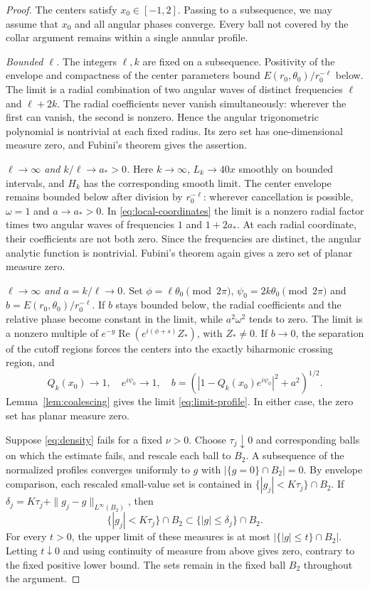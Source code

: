 \documentclass[11pt,twoside,leqno]{article}
\numberwithin{equation}{section}
\theoremstyle{definition}
\theoremstyle{remark}
\begin{document}
\begin{proof}
The centers satisfy $x_0\in[-1,2]$. Passing to a subsequence, we may
assume that $x_0$ and all angular phases converge. Every ball not
covered by the collar argument remains within a single annular profile.

\emph{Bounded $\ell$.}
The integers $\ell,k$ are fixed on a subsequence. Positivity of the
envelope and compactness of the center parameters bound
$E(r_0,\theta_0)/r_0^{-\ell}$ below. The limit is a radial combination
of two angular waves of distinct frequencies $\ell$ and $\ell+2k$.
The radial coefficients never vanish simultaneously: wherever the
first can vanish, the second is nonzero. Hence the angular
trigonometric polynomial is nontrivial at each fixed radius. Its
zero set has one-dimensional measure zero, and Fubini's theorem gives
the assertion.

\emph{$\ell\to\infty$ and $k/\ell\to a_*>0$.}
Here $k\to\infty$, $L_k\to40x$ smoothly on bounded intervals, and
$H_k$ has the corresponding smooth limit. The center envelope remains
bounded below after division by $r_0^{-\ell}$: wherever cancellation
is possible, $\omega=1$ and $a\to a_*>0$.
In \eqref{eq:local-coordinates} the limit is a nonzero radial factor
times two angular waves of frequencies $1$ and $1+2a_*$. At each radial coordinate, their coefficients are not both zero.
Since the frequencies are distinct, the angular analytic function is
nontrivial. Fubini's theorem again gives a zero set of planar measure
zero.

\emph{$\ell\to\infty$ and $a=k/\ell\to0$.}
Set $\phi=\ell\theta_0\pmod{2\pi}$,
$\psi_0=2k\theta_0\pmod{2\pi}$ and
$b=E(r_0,\theta_0)/r_0^{-\ell}$.
If $b$ stays bounded below, the radial coefficients and the relative
phase become constant in the limit, while $a^2\omega^2$ tends to
zero. The limit is a nonzero multiple of
$e^{-y}\operatorname{Re}(e^{i(\phi+s)}Z_*)$, with $Z_*\ne0$.
If $b\to0$, the separation of the cutoff regions forces the centers
into the exactly biharmonic crossing region, and
\[
 Q_k(x_0)\to1,\quad e^{i\psi_0}\to1,\quad
 b=(|1-Q_k(x_0)e^{i\psi_0}|^2+a^2)^{1/2}.
\]
Lemma~\ref{lem:coalescing} gives the limit \eqref{eq:limit-profile}.
In either case, the zero set has planar measure zero.

Suppose \eqref{eq:density} fails for a fixed $\nu>0$. Choose $\tau_j\downarrow0$ and corresponding balls on which the
estimate fails, and rescale each ball to $B_2$. A subsequence of the
normalized profiles converges uniformly to $g$ with
$|\{g=0\}\cap B_2|=0$. By envelope comparison, each rescaled
small-value set is contained in $\{|g_j|<K\tau_j\}\cap B_2$. If
$\delta_j=K\tau_j+\|g_j-g\|_{L^\infty(B_2)}$, then
\[
 \{|g_j|<K\tau_j\}\cap B_2\subset\{|g|\le\delta_j\}\cap B_2.
\]
For every $t>0$, the upper limit of these measures is at most
$|\{|g|\le t\}\cap B_2|$. Letting $t\downarrow0$ and using
continuity of measure from above gives zero, contrary to the fixed
positive lower bound. The sets remain in the fixed ball $B_2$
throughout the argument.
\end{proof}
\end{document}
